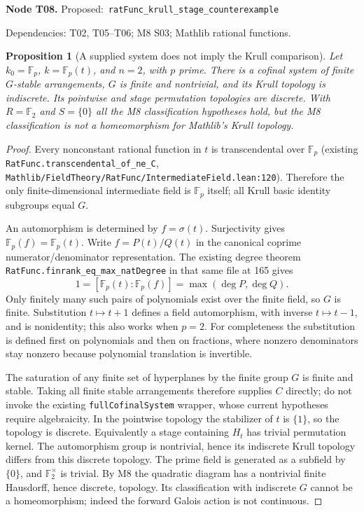 \documentclass[11pt]{article}
\newtheorem{proposition}[theorem]{Proposition}
\theoremstyle{remark}\newtheorem{remark}[theorem]{Remark}
\newcommand{\F}{\mathbb F}
\newcommand{\code}[1]{{\normalfont\nolinkurl{#1}}}
\newcommand{\node}[3]{\par\Needspace{8\baselineskip}\smallskip\noindent\textbf{Node #1.}\quad
 \textsf{Proposed:}\ \code{#2}\par\noindent
 \textsf{Dependencies:} #3.\par\smallskip}
\begin{document}
\node{T08}{ratFunc_krull_stage_counterexample}{T02, T05--T06; M8 S03; Mathlib rational functions}
\begin{proposition}[A supplied system does not imply the Krull comparison]\label{prop:t08}
Let $k_0=\F_p$, $k=\F_p(t)$, and $n=2$, with $p$ prime. There is a
cofinal system of finite $G$-stable arrangements, $G$ is finite and
nontrivial, and its Krull topology is indiscrete. Its pointwise and
stage permutation topologies are discrete. With $R=\F_2$ and
$S=\{0\}$ all the M8 classification hypotheses hold, but the M8
classification is not a homeomorphism for Mathlib's Krull topology.
\end{proposition}
\begin{proof}
Every nonconstant rational function in $t$ is transcendental over
$\F_p$ (existing \code{RatFunc.transcendental_of_ne_C},
\code{Mathlib/FieldTheory/RatFunc/IntermediateField.lean:120}).
Therefore the only finite-dimensional intermediate field is $\F_p$
itself; all Krull basic identity subgroups equal $G$.

An automorphism is determined by $f=\sigma(t)$. Surjectivity gives
$\F_p(f)=\F_p(t)$. Write $f=P(t)/Q(t)$ in the canonical coprime
numerator/denominator representation. The existing degree theorem
\code{RatFunc.finrank_eq_max_natDegree} in that same file at 165 gives
\[
             1=[\F_p(t):\F_p(f)]=\max(\deg P,\deg Q).
\]
Only finitely many such pairs of polynomials exist over the finite
field, so $G$ is finite. Substitution $t\mapsto t+1$ defines a field
automorphism, with inverse $t\mapsto t-1$, and is nonidentity; this
also works when $p=2$. For completeness the substitution is defined
first on polynomials and then on fractions, where nonzero denominators
stay nonzero because polynomial translation is invertible.

The saturation of any finite set of hyperplanes by the finite group
$G$ is finite and stable. Taking all finite stable arrangements
therefore supplies $C$ directly; do not invoke the existing
\code{fullCofinalSystem} wrapper, whose current hypotheses require
algebraicity. In the pointwise topology the stabilizer of $t$ is
$\{1\}$, so the topology is discrete. Equivalently a stage containing
$H_t$ has trivial permutation kernel. The automorphism group is
nontrivial, hence its indiscrete Krull topology differs from this
discrete topology. The prime field is generated as a subfield by
$\{0\}$, and $\F_2^\times$ is trivial. By M8 the quadratic diagram
has a nontrivial finite Hausdorff, hence discrete, topology. Its
classification with indiscrete $G$ cannot be a homeomorphism; indeed
the forward Galois action is not continuous.
\end{proof}
\end{document}
